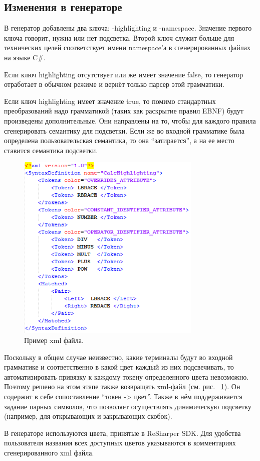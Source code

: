 \subsection{Изменения в генераторе}

В генератор добавлены два ключа: -highlighting и -namespace. Значение первого ключа говорит, нужна или нет подсветка. Второй ключ служит больше для технических целей соответствует имени namespace’а в сгенерированных файлах на языке C\#.

Если ключ highlighting отсутствует или же имеет значение false, то генератор отработает в обычном режиме и вернёт только парсер этой грамматики. 

Если ключ highlighting имеет значение true, то помимо стандартных преобразований надо грамматикой (таких как раскрытие правил EBNF) будут произведены дополнительные. Они направлены на то, чтобы для каждого правила сгенерировать семантику для подсветки. Если же во входной грамматике была определена пользовательская семантика, то она “затирается”, а на ее место ставится семантика подсветки. 

\begin{figure}[h]
\centering
\includegraphics[height=90mm]{Pictures/xmlExample.PNG}
\caption{Пример xml файла.}
\label{xml}
\end{figure}

Поскольку в общем случае неизвестно, какие терминалы будут во входной грамматике и соответственно в какой цвет каждый из них подсвечивать, то автоматизировать привязку к каждому токену определенного цвета невозможно. Поэтому решено на этом этапе также возвращать xml-файл (см. рис. ~\ref{xml}). Он содержит в себе сопоставление “токен -> цвет”. Также в нём поддерживается задание парных символов, что позволяет осуществлять динамическую подсветку (например, для открывающих и закрывающих скобок). 

В генераторе используются цвета, принятые в ReSharper SDK. Для удобства пользователя названия всех доступных цветов указываются в комментариях сгенерированного xml файла. 